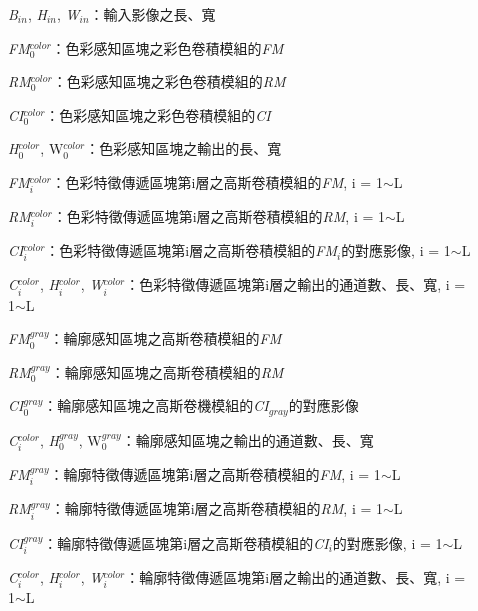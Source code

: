 \documentclass[class=NCU_thesis, crop=false]{standalone}
\begin{document}
	\begin{description}
		\item[]\textit{B}$_{in}$, \textit{H}$_{in}$, \textit{W}$_{in}$：輸入影像之長、寬

		\item[]\textit{FM}$^{color}_{0}$：色彩感知區塊之彩色卷積模組的\textit{FM}
		\item[]\textit{RM}$^{color}_{0}$：色彩感知區塊之彩色卷積模組的\textit{RM}
		\item[]\textit{CI}$^{color}_{0}$：色彩感知區塊之彩色卷積模組的\textit{CI}
		\item[]\textit{H}$^{color}_{0}$, {W}$^{color}_{0}$：色彩感知區塊之輸出的長、寬

		\item[]\textit{FM}$^{color}_{i}$：色彩特徵傳遞區塊第i層之高斯卷積模組的\textit{FM}, i = 1$\sim$L
		\item[]\textit{RM}$^{color}_{i}$：色彩特徵傳遞區塊第i層之高斯卷積模組的\textit{RM}, i = 1$\sim$L
		\item[]\textit{CI}$^{color}_{i}$：色彩特徵傳遞區塊第i層之高斯卷積模組的\textit{FM}$_{i}$的對應影像, i = 1$\sim$L
		\item[]\textit{C}$^{color}_{i}$, \textit{H}$^{color}_{i}$, \textit{W}$^{color}_{i}$：色彩特徵傳遞區塊第i層之輸出的通道數、長、寬, i = 1$\sim$L
		
		\item[]\textit{FM}$^{gray}_{0}$：輪廓感知區塊之高斯卷積模組的\textit{FM}
		\item[]\textit{RM}$^{gray}_{0}$：輪廓感知區塊之高斯卷積模組的\textit{RM}
		\item[]\textit{CI}$^{gray}_{0}$：輪廓感知區塊之高斯卷機模組的\textit{CI}$_{gray}$的對應影像
		\item[]\textit{C}$^{color}_{i}$, \textit{H}$^{gray}_{0}$, {W}$^{gray}_{0}$：輪廓感知區塊之輸出的通道數、長、寬

		\item[]\textit{FM}$^{gray}_{i}$：輪廓特徵傳遞區塊第i層之高斯卷積模組的\textit{FM}, i = 1$\sim$L
		\item[]\textit{RM}$^{gray}_{i}$：輪廓特徵傳遞區塊第i層之高斯卷積模組的\textit{RM}, i = 1$\sim$L
		\item[]\textit{CI}$^{gray}_{i}$：輪廓特徵傳遞區塊第i層之高斯卷積模組的\textit{CI}$_{i}$的對應影像, i = 1$\sim$L
		\item[]\textit{C}$^{color}_{i}$, \textit{H}$^{color}_{i}$, \textit{W}$^{color}_{i}$：輪廓特徵傳遞區塊第i層之輸出的通道數、長、寬, i = 1$\sim$L
	\end{description}
\end{document}
